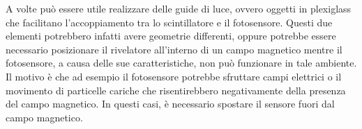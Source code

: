 A volte può essere utile realizzare delle guide di luce, ovvero oggetti in plexiglass che facilitano l'accoppiamento tra lo scintillatore e il fotosensore. Questi due elementi potrebbero infatti avere geometrie differenti, oppure potrebbe essere necessario posizionare il rivelatore all'interno di un campo magnetico mentre il fotosensore, a causa delle sue caratteristiche, non può funzionare in tale ambiente. Il motivo è che ad esempio il fotosensore potrebbe sfruttare campi elettrici o il movimento di particelle cariche che risentirebbero negativamente della presenza del campo magnetico. In questi casi, è necessario spostare il sensore fuori dal campo magnetico.

\begin{figure}[H]
   \centering
\end{figure}


